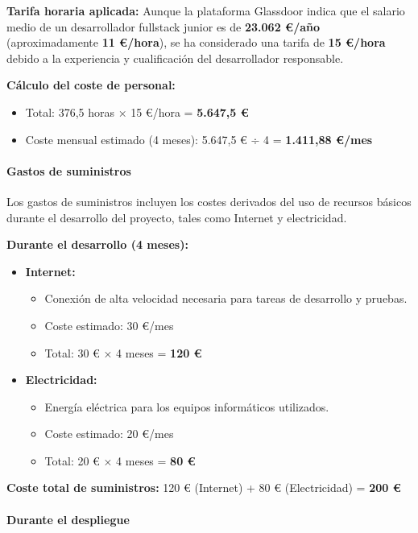 \textbf{Tarifa horaria aplicada:} Aunque la plataforma Glassdoor \cite{webGlassdoor} indica que el salario medio de un desarrollador fullstack junior es de \textbf{23.062 €/año} (aproximadamente \textbf{11 €/hora}), se ha considerado una tarifa de \textbf{15 €/hora} debido a la experiencia y cualificación del desarrollador responsable.

\textbf{Cálculo del coste de personal:}
\begin{itemize}
    \item Total: 376,5 horas × 15 €/hora = \textbf{5.647,5 €}
    \item Coste mensual estimado (4 meses): 5.647,5 € ÷ 4 = \textbf{1.411,88 €/mes}
\end{itemize}

\paragraph{Gastos de suministros}

Los gastos de suministros incluyen los costes derivados del uso de recursos básicos durante el desarrollo del proyecto, tales como Internet y electricidad.

\textbf{Durante el desarrollo (4 meses):}
\begin{itemize}
    \item \textbf{Internet:} 
    \begin{itemize}
        \item Conexión de alta velocidad necesaria para tareas de desarrollo y pruebas.
        \item Coste estimado: 30 €/mes
        \item Total: 30 € × 4 meses = \textbf{120 €}
    \end{itemize}
    \item \textbf{Electricidad:}
    \begin{itemize}
        \item Energía eléctrica para los equipos informáticos utilizados.
        \item Coste estimado: 20 €/mes
        \item Total: 20 € × 4 meses = \textbf{80 €}
    \end{itemize}
\end{itemize}

\textbf{Coste total de suministros:} 120 € (Internet) + 80 € (Electricidad) = \textbf{200 €}

\paragraph{Durante el despliegue}

